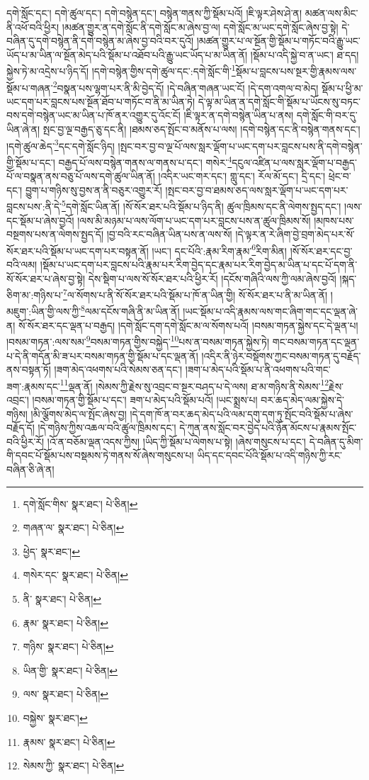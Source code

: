 དགེ་སློང་དང་། དགེ་ཚུལ་དང་། དགེ་བསྙེན་དང་། བསྙེན་གནས་ཀྱི་སྡོམ་པའོ། །ཇི་ལྟར་ཤེས་ཤེ་ན། མཚན་ལས་མིང་ནི་འཕོ་བའི་ཕྱིར། །མཚན་གྱུར་ན་དགེ་སློང་ནི་དགེ་སློང་མ་ཞེས་བྱ་ལ། དགེ་སློང་མ་ཡང་དགེ་སློང་ཞེས་བྱ་སྟེ། དེ་བཞིན་དུ་དགེ་བསྙེན་ནི་དགེ་བསྙེན་མ་ཞེས་བྱ་བའི་བར་དུའོ། །མཚན་གྱུར་པ་ལ་སྔོན་གྱི་སྡོམ་པ་གཏོང་བའི་རྒྱུ་ཡང་ཡོད་པ་མ་ཡིན་ལ་སྔོན་མེད་པའི་སྡོམ་པ་འཐོབ་པའི་རྒྱུ་ཡང་ཡོད་པ་མ་ཡིན་ནོ། །སྡོམ་པ་འདི་སྐྱེ་བ་ན་ཡང་། ཐ་དད། སྐྱེས་ཏེ་མ་འདྲེས་པ་ཉིད་དོ། །དགེ་བསྙེན་གྱིས་དགེ་ཚུལ་དང་:དགེ་སློང་གི་\footnote{དགེ་སློང་གིས་  སྣར་ཐང་།  པེ་ཅིན། }སྡོམ་པ་བླངས་པས་སྔར་གྱི་རྣམས་ལས་སྡོམ་པ་གཞན་\footnote{གཞན་ལ་  སྣར་ཐང་།  པེ་ཅིན། }བསྣན་པས་ལྷག་པར་ནི་མི་བྱེད་དོ། །དེ་བཞིན་གཞན་ཡང་ངོ། །དེ་དག་འགལ་བ་མེད། སྡོམ་པ་ཕྱི་མ་ཡང་དག་པར་བླངས་པས་སྔོན་ཐོབ་པ་གཏོང་བ་ནི་མ་ཡིན་ཏེ། དེ་ལྟ་མ་ཡིན་ན་དགེ་སློང་གི་སྡོམ་པ་ཡོངས་སུ་བཏང་བས་དགེ་བསྙེན་ཡང་མ་ཡིན་པ་ཁོ་ནར་འགྱུར་དུ་འོང་ངོ། །ཇི་ལྟར་ན་དགེ་བསྙེན་ཡིན་པ་ནས། དགེ་སློང་གི་བར་དུ་ཡིན་ཞེ་ན། སྤང་བྱ་ལྔ་བརྒྱད་ཅུ་དང་ནི། །ཐམས་ཅད་སྤོང་བ་མནོས་པ་ལས། །དགེ་བསྙེན་དང་ནི་བསྙེན་གནས་དང་། །དགེ་ཚུལ་ཆེད་\footnote{ཕྱེད་  སྣར་ཐང་། }དང་དགེ་སློང་ཉིད། །སྤང་བར་བྱ་བ་ལྔ་པོ་ལས་སླར་ལྡོག་པ་ཡང་དག་པར་བླངས་པས་ནི་དགེ་བསྙེན་གྱི་སྡོམ་པ་དང་། བརྒྱད་པོ་ལས་བསྙེན་གནས་ལ་གནས་པ་དང་། གསེར་\footnote{གསེར་དང་  སྣར་ཐང་།  པེ་ཅིན། }དངུལ་འཛིན་པ་ལས་སླར་ལྡོག་པ་བརྒྱད་པོ་ལ་བསྣན་ནས་བཅུ་པོ་ལས་དགེ་ཚུལ་ཡིན་ནོ། །འདིར་ཡང་གར་དང་། གླུ་དང་། རོལ་མོ་དང་། དྲི་དང་། ཕྲེང་བ་དང་། བྱུག་པ་གཉིས་སུ་བྱས་ན་ནི་བཅུར་འགྱུར་རོ། །སྤང་བར་བྱ་བ་ཐམས་ཅད་ལས་སླར་ལྡོག་པ་ཡང་དག་པར་བླངས་པས་:ནི་དེ་\footnote{ནི་  སྣར་ཐང་།  པེ་ཅིན། }དགེ་སློང་ཡིན་ནོ། །སོ་སོར་ཐར་པའི་སྡོམ་པ་ཉིད་ནི། ཚུལ་ཁྲིམས་དང་ནི་ལེགས་སྤྱད་དང་། །ལས་དང་སྡོམ་པ་ཞེས་བྱའོ། །ལས་མི་མཉམ་པ་ལས་ལོག་པ་ཡང་དག་པར་བླངས་པས་ན་ཚུལ་ཁྲིམས་སོ། །མཁས་པས་བསྔགས་པས་ན་ལེགས་སྤྱད་དོ། །བྱ་བའི་རང་བཞིན་ཡིན་པས་ན་ལས་སོ། །དེ་ལྟར་ན་རེ་ཞིག་བྱེ་བྲག་མེད་པར་སོ་སོར་ཐར་པའི་སྡོམ་པ་ཡང་དག་པར་བསྟན་ནོ། །ཡང་། དང་པོའི་:རྣམ་རིག་རྣམ་\footnote{རྣམ་  སྣར་ཐང་།  པེ་ཅིན། }རིག་མིན། །སོ་སོར་ཐར་དང་བྱ་བའི་ལམ། །སྡོམ་པ་ཡང་དག་པར་བླངས་པའི་རྣམ་པར་རིག་བྱེད་དང་རྣམ་པར་རིག་བྱེད་མ་ཡིན་པ་དང་པོ་དག་ནི་སོ་སོར་ཐར་པ་ཞེས་བྱ་སྟེ། དེས་སྡིག་པ་ལས་སོ་སོར་ཐར་པའི་ཕྱིར་རོ། །དངོས་གཞིའི་ལས་ཀྱི་ལམ་ཞེས་བྱའོ། །སྐད་ཅིག་མ་:གཉིས་པ་\footnote{གཉིས་  སྣར་ཐང་།  པེ་ཅིན། }ལ་སོགས་པ་ནི་སོ་སོར་ཐར་པའི་སྡོམ་པ་ཁོ་ན་ཡིན་གྱི། སོ་སོར་ཐར་པ་ནི་མ་ཡིན་ནོ། །མཇུག་:ཡིན་གྱི་ལས་ཀྱི་\footnote{ཡིན་གྱི་  སྣར་ཐང་།  པེ་ཅིན། }ལམ་དངོས་གཞི་ནི་མ་ཡིན་ནོ། །ཡང་སྡོམ་པ་འདི་རྣམས་ལས་གང་ཞིག་གང་དང་ལྡན་ཞེ་ན། སོ་སོར་ཐར་དང་ལྡན་པ་བརྒྱད། །དགེ་སློང་དག་དགེ་སློང་མ་ལ་སོགས་པའོ། །བསམ་གཏན་སྐྱེས་དང་དེ་ལྡན་པ། །བསམ་གཏན་:ལས་སམ་\footnote{ལས་  སྣར་ཐང་།  པེ་ཅིན། }བསམ་གཏན་གྱིས་བསྐྱེད་\footnote{བསྐྱེས་  སྣར་ཐང་། }པས་ན་བསམ་གཏན་སྐྱེས་ཏེ། གང་བསམ་གཏན་དང་ལྡན་པ་དེ་ནི་གདོན་མི་ཟ་པར་བསམ་གཏན་གྱི་སྡོམ་པ་དང་ལྡན་ནོ། །འདིར་ནི་ཉེར་བསྡོགས་ཀྱང་བསམ་གཏན་དུ་བརྗོད་ནས་བསྟན་ཏོ། །ཟག་མེད་འཕགས་པའི་སེམས་ཅན་དང་། །ཟག་པ་མེད་པའི་སྡོམ་པ་ནི་འཕགས་པའི་གང་ཟག་:རྣམས་དང་\footnote{རྣམས་  སྣར་ཐང་།  པེ་ཅིན། }ལྡན་ནོ། །སེམས་ཀྱི་རྗེས་སུ་འབྲང་བ་སྔར་བཤད་པ་དེ་ལས། ཐ་མ་གཉིས་ནི་སེམས་\footnote{སེམས་ཀྱི་  སྣར་ཐང་།  པེ་ཅིན། }རྗེས་འབྲང་། །བསམ་གཏན་གྱི་སྡོམ་པ་དང་། ཟག་པ་མེད་པའི་སྡོམ་པའོ། །ཡང་སྨྲས་པ། བར་ཆད་མེད་ལམ་སྐྱེས་དེ་གཉིས། །མི་ལྕོགས་མེད་ལ་སྤོང་ཞེས་བྱ། །དེ་དག་ཁོ་ན་བར་ཆད་མེད་པའི་ལམ་དགུ་དག་ཏུ་སྤོང་བའི་སྡོམ་པ་ཞེས་བརྗོད་དོ། །དེ་གཉིས་ཀྱིས་འཆལ་བའི་ཚུལ་ཁྲིམས་དང་། དེ་ཀུན་ནས་སློང་བར་བྱེད་པའི་ཉོན་མོངས་པ་རྣམས་སྤོང་བའི་ཕྱིར་རོ། །འོ་ན་བཅོམ་ལྡན་འདས་ཀྱིས། །ཡིད་ཀྱི་སྡོམ་པ་ལེགས་པ་སྟེ། །ཞེས་གསུངས་པ་དང་། དེ་བཞིན་དུ་མིག་གི་དབང་པོ་སྡོམ་པས་བསྡམས་ཏེ་གནས་སོ་ཞེས་གསུངས་པ། ཡིད་དང་དབང་པོའི་སྡོམ་པ་འདི་གཉིས་ཀྱི་རང་བཞིན་ཅི་ཞེ་ན། 